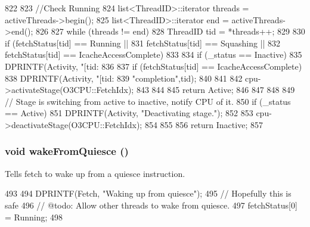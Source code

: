 \begin{DoxyCode}
822 {
823     //Check Running
824     list<ThreadID>::iterator threads = activeThreads->begin();
825     list<ThreadID>::iterator end = activeThreads->end();
826 
827     while (threads != end) {
828         ThreadID tid = *threads++;
829 
830         if (fetchStatus[tid] == Running ||
831             fetchStatus[tid] == Squashing ||
832             fetchStatus[tid] == IcacheAccessComplete) {
833 
834             if (_status == Inactive) {
835                 DPRINTF(Activity, "[tid:%
836 
837                 if (fetchStatus[tid] == IcacheAccessComplete) {
838                     DPRINTF(Activity, "[tid:%
839                             "completion\n",tid);
840                 }
841 
842                 cpu->activateStage(O3CPU::FetchIdx);
843             }
844 
845             return Active;
846         }
847     }
848 
849     // Stage is switching from active to inactive, notify CPU of it.
850     if (_status == Active) {
851         DPRINTF(Activity, "Deactivating stage.\n");
852 
853         cpu->deactivateStage(O3CPU::FetchIdx);
854     }
855 
856     return Inactive;
857 }
\end{DoxyCode}
\hypertarget{classDefaultFetch_a040cbeac7187b0b8cdb1242d3f5aa179}{
\subsubsection[{wakeFromQuiesce}]{\setlength{\rightskip}{0pt plus 5cm}void wakeFromQuiesce ()}}
\label{classDefaultFetch_a040cbeac7187b0b8cdb1242d3f5aa179}
Tells fetch to wake up from a quiesce instruction. 


\begin{DoxyCode}
493 {
494     DPRINTF(Fetch, "Waking up from quiesce\n");
495     // Hopefully this is safe
496     // @todo: Allow other threads to wake from quiesce.
497     fetchStatus[0] = Running;
498 }
\end{DoxyCode}


